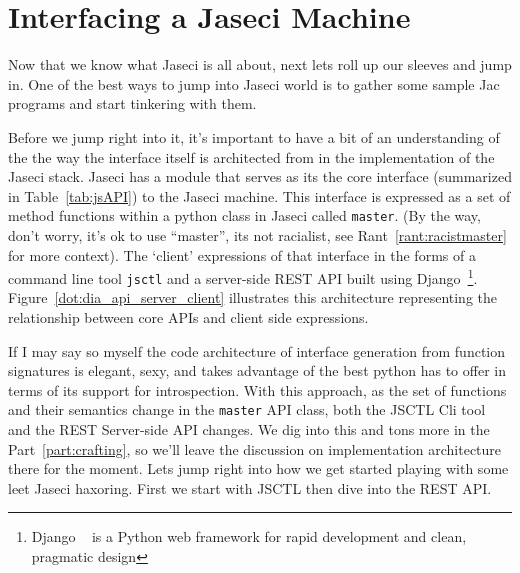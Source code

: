 \chapter{Interfacing a Jaseci Machine}
\minitoc
{}
Now that we know what Jaseci is all about, next lets roll up our sleeves and jump in. One of the best ways to jump into Jaseci world is to gather some sample Jac programs and start tinkering with them.
\par
Before we jump right into it, it's important to have a bit of an understanding of the the way the interface itself is architected from in the implementation of the Jaseci stack. Jaseci has a module that serves as its  the core interface (summarized in Table~\ref{tab:jsAPI}) to the Jaseci machine. This interface is expressed as a set of method functions within a python class in Jaseci  called \texttt{master}. (By the way, don't worry, it's ok to use ``master'', its not racialist, see Rant~\ref{rant:racistmaster} for more context). The `client' expressions of that interface in the forms of a command line tool \texttt{jsctl} and a server-side REST API built using Django~\footnote{Django ~\cite{django} is a Python web framework for rapid development and clean, pragmatic design}. Figure~\ref{dot:dia_api_server_client} illustrates this architecture representing the relationship between core APIs and client side expressions.

If I may say so myself the code architecture of interface generation from function signatures is elegant, sexy, and takes advantage of the best python has to offer in terms of its support for introspection. With this approach, as the set of functions and their semantics change in the \texttt{master} API class, both the JSCTL Cli tool and the REST Server-side API changes. We dig into this and tons more in the Part~\ref{part:crafting}, so we'll leave the discussion on implementation architecture there for the moment. Lets jump right into how we get started playing with some \gls{leet} Jaseci \gls{haxor}ing. First we start with JSCTL then dive into the REST API.


